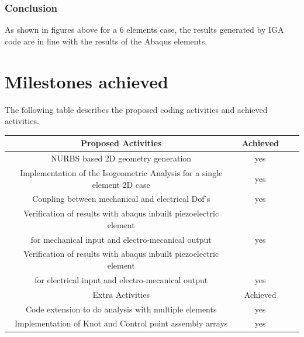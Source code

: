 \documentclass[11pt]{article}
\begin{document}
\subsubsection{Conclusion}
As shown in figures above for a 6 elements case, the results generated by IGA code are in line with the results of the Abaqus elements.  




 



\newpage
\section{Milestones achieved}
The following table describes the proposed coding activities and achieved activities.
\begin{center}
	\begin{tabular}{ |c|c|c|c| } 
		\hline
		Proposed Activities & Achieved \\
		\hline 
		NURBS based 2D geometry generation & yes \\
		Implementation of the Isogeometric Analysis for a single element 2D case & yes \\  
		Coupling between mechanical and electrical Dof’s & yes \\ 
		Verification of results with abaqus inbuilt piezoelectric element & \\
		for mechanical input and electro-mecanical output & yes \\ 
		Verification of results with abaqus inbuilt piezoelectric element & \\
		for electrical input and electro-mecanical output & yes \\ 
		\hline
		Extra Activities & Achieved \\
		\hline
		Code extension to do analysis with multiple elements & yes \\
		Implementation of Knot and Control point assembly arrays & yes \\
		\hline
	\end{tabular}
\end{center}
\end{document}
